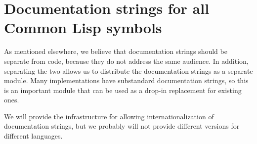 \chapter{Documentation strings for all Common Lisp symbols}

As mentioned elsewhere, we believe that documentation strings should
be separate from code, because they do not address the same audience.
In addition, separating the two allows us to distribute the
documentation strings as a separate module.  Many implementations have
substandard documentation strings, so this is an important module that
can be used as a drop-in replacement for existing ones.

We will provide the infrastructure for allowing internationalization
of documentation strings, but we probably will not provide different
versions for different languages.
